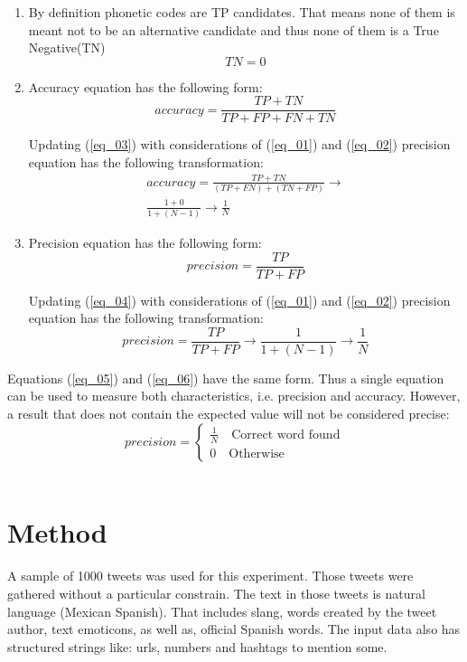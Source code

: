 \documentclass[9pt,conference]{IEEEtran}
\begin{document}
\begin{enumerate}
\item 
By definition phonetic codes are TP candidates. That means none of them is meant not to be
an alternative candidate and thus none of them is a True Negative(TN)
\begin{equation}
TN=0
\end{equation}

\item Accuracy equation has the following form:
\begin{equation}
accuracy=\frac{TP+ TN}{TP + FP + FN + TN}
\label{eq_03}
\end{equation}

Updating (\ref{eq_03}) with considerations of (\ref{eq_01}) and (\ref{eq_02}) precision equation has the following transformation:
\begin{multline}
accuracy=\frac{TP+ TN}{(TP + FN) + (TN+ FP)} \to \\ \frac{1+ 0}{1 + (N-1)} \to \frac{1}{N}
\label{eq_05}
\end{multline}


\item Precision equation has the following form:
\begin{equation}
precision=\frac{TP}{TP + FP}
\label{eq_04}
\end{equation}

Updating (\ref{eq_04}) with considerations of (\ref{eq_01}) and (\ref{eq_02}) precision equation has the following transformation:
\begin{equation}
precision=\frac{TP}{TP + FP} \to \frac{1}{1 + (N-1)} \to \frac{1}{N}
\label{eq_06}
\end{equation}


\end{enumerate}

Equations (\ref{eq_05}) and (\ref{eq_06}) have the same form. Thus a single 
equation can be used to measure both characteristics, i.e. precision and accuracy.
However, a result that does not contain the expected value will not be considered
precise:
\[   
precision = 
     \begin{cases}
       \text{$\frac{1}{N}$}\quad\text{Correct word found}\\
       \text{$0$}\quad\text{Otherwise}\
     \end{cases}
\] 
\\


\section{Method}
A sample of 1000 tweets was used for this experiment. Those tweets were gathered
without a particular constrain. The text in those tweets is natural language (Mexican 
Spanish). That includes slang, words created by the tweet author, text 
emoticons, as well as, official Spanish words. The input data also has structured strings 
like: urls, numbers and hashtags to mention some.\\
\end{document}
